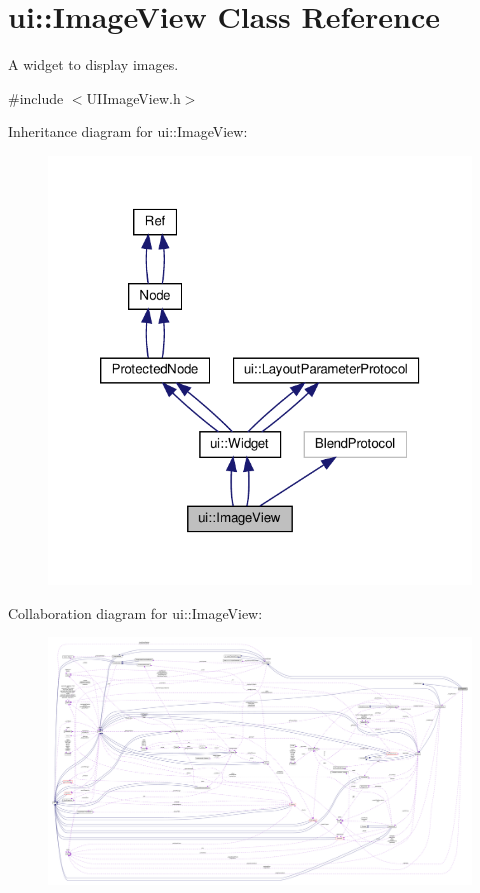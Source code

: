 \hypertarget{classui_1_1ImageView}{}\section{ui\+:\+:Image\+View Class Reference}
\label{classui_1_1ImageView}


A widget to display images.  




{\ttfamily \#include $<$U\+I\+Image\+View.\+h$>$}



Inheritance diagram for ui\+:\+:Image\+View\+:
\nopagebreak
\begin{figure}[H]
\begin{center}
\leavevmode
\includegraphics[width=320pt]{classui_1_1ImageView__inherit__graph}
\end{center}
\end{figure}


Collaboration diagram for ui\+:\+:Image\+View\+:
\nopagebreak
\begin{figure}[H]
\begin{center}
\leavevmode
\includegraphics[width=350pt]{classui_1_1ImageView__coll__graph}
\end{center}
\end{figure}

